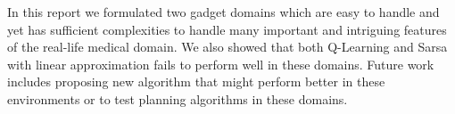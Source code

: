 In this report we formulated two gadget domains which are easy to handle and yet has sufficient complexities to handle many important and intriguing features of the real-life medical domain. We also showed that both Q-Learning and Sarsa with linear approximation fails to perform well in these domains. Future work includes proposing new algorithm that might perform better in these environments or to test planning algorithms in these domains.